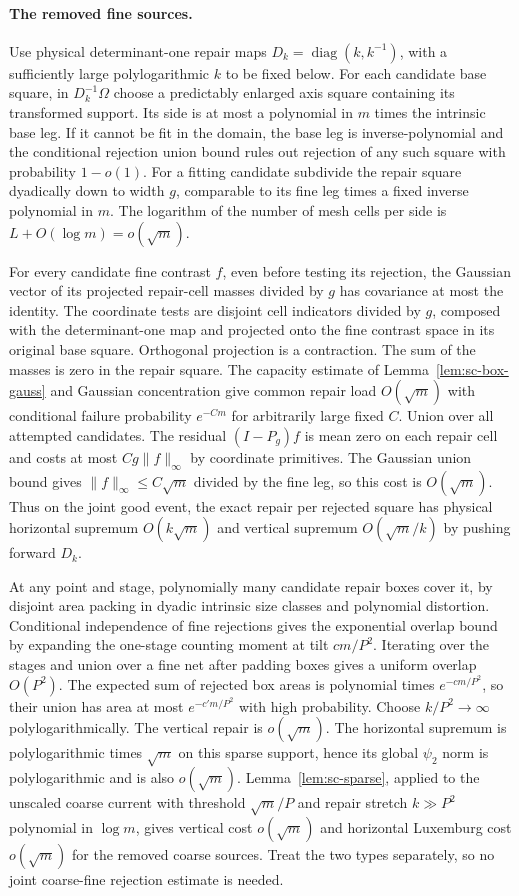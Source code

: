 \documentclass[11pt]{article}
\newcommand{\1}{\mathbf{1}}
\numberwithin{equation}{section}
\newcommand{\diag}{\operatorname{diag}}
\begin{document}
\paragraph{The removed fine sources.}
Use physical determinant-one repair maps
$D_k=\diag(k,k^{-1})$, with a sufficiently large polylogarithmic
$k$ to be fixed below. For each candidate base square, in
$D_k^{-1}\Omega$ choose a predictably enlarged axis square
containing its transformed support. Its side is at most a
polynomial in $m$ times the intrinsic base leg. If it cannot
be fit in the domain, the base leg is inverse-polynomial and
the conditional rejection union bound rules out rejection
of any such square with probability $1-o(1)$.
For a fitting candidate subdivide the repair square dyadically down
to width $g$, comparable to its fine leg times a fixed inverse
polynomial in $m$. The logarithm of the number of mesh cells per side is
$L+O(\log m)=o(\sqrt m)$.

For every candidate fine contrast $f$, even before testing
its rejection, the Gaussian vector of its projected repair-cell
masses divided by $g$ has covariance at most the identity.
The coordinate tests are disjoint cell indicators divided by
$g$, composed with the determinant-one map and projected onto
the fine contrast space in its original base square. Orthogonal
projection is a contraction. The sum of the masses is zero
in the repair square. The capacity estimate of Lemma~\ref{lem:sc-box-gauss} and Gaussian
concentration give common repair load $O(\sqrt m)$ with
conditional failure probability $e^{-C m}$ for arbitrarily
large fixed $C$. Union over all attempted candidates.
The residual $(I-P_g)f$ is mean zero on each repair cell and
costs at most $Cg\|f\|_\infty$ by coordinate primitives.
The Gaussian union bound gives $\|f\|_\infty\le C\sqrt m$
divided by the fine leg, so this cost is $O(\sqrt m)$.
Thus on the joint good event, the exact repair per rejected
square has physical horizontal supremum $O(k\sqrt m)$ and
vertical supremum $O(\sqrt m/k)$ by pushing forward $D_k$.

At any point and stage, polynomially many candidate repair
boxes cover it, by disjoint area packing in dyadic intrinsic
size classes and polynomial distortion. Conditional independence
of fine rejections gives the exponential overlap bound by
expanding the one-stage counting moment at tilt $c m/P^2$.
Iterating over the stages and union over a fine net after
padding boxes gives a uniform overlap $O(P^2)$. The expected
sum of rejected box areas is polynomial times
$e^{-c m/P^2}$, so their union has area at most
$e^{-c' m/P^2}$ with high probability. Choose $k/P^2\to\infty$
polylogarithmically. The vertical repair is $o(\sqrt m)$.
The horizontal supremum is polylogarithmic times $\sqrt m$
on this sparse support, hence its global $\psi_2$ norm is
polylogarithmic and is also $o(\sqrt m)$.
Lemma~\ref{lem:sc-sparse}, applied to the unscaled coarse
current with threshold \(\sqrt m/P\) and repair stretch
\(k\gg P^2\) polynomial in \(\log m\), gives
vertical cost \(o(\sqrt m)\) and horizontal Luxemburg cost
\(o(\sqrt m)\) for the removed coarse sources. Treat the two types
separately, so no joint coarse-fine rejection estimate is needed.
\end{document}
